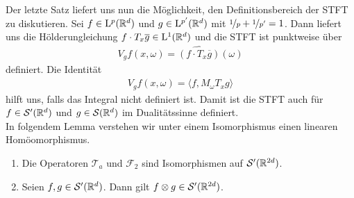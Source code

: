 Der letzte Satz liefert uns nun die Möglichkeit, den Definitionsbereich der STFT zu diskutieren.
Sei $ f \in \mathrm{L}^p(\mathbb{R}^d) $ und $ g \in \mathrm{L}^{p^\prime}(\mathbb{R}^d) $ mit $ \nicefrac{1}{p} + \nicefrac{1}{p^\prime} = 1 $.
Dann liefert uns die Hölderungleichung $ f \cdot T_x \overline{g} \in \mathrm{L}^1(\mathbb{R}^d) $ und die STFT ist punktweise über
\begin{align*}
V_g f(x,\omega ) = \widehat{(f \cdot T_x \overline{g})} (\omega)
\end{align*}
definiert. Die Identität
\begin{align*}
V_g f(x,\omega) = \langle f, M_\omega T_x g \rangle
\end{align*}
hilft uns, falls das Integral nicht definiert ist.
Damit ist die STFT auch für $ f \in \mathcal{S}^\prime(\mathbb{R}^d)  $ und $ g \in \mathcal{S}(\mathbb{R}^d) $ im Dualitätssinne definiert.\\
In folgendem Lemma verstehen wir unter einem Isomorphismus einen linearen Homöomorphismus.
\newpage
\begin{lem}\label{th:iso_tensor_distri}
	\begin{enumerate}[label =\textbf{(\roman*)}]
		\item 
		Die Operatoren $ \mathcal{T}_a $ und $ \mathcal{F}_2 $ sind Isomorphismen auf $ \mathcal{S}^\prime(\mathbb{R}^{2d}) $.
		\item
		Seien $ f,g \in \mathcal{S}^\prime(\mathbb{R}^d) $.
		Dann gilt $ f \otimes g \in \mathcal{S}^\prime(\mathbb{R}^{2d}) $.
	\end{enumerate}
\end{lem}

